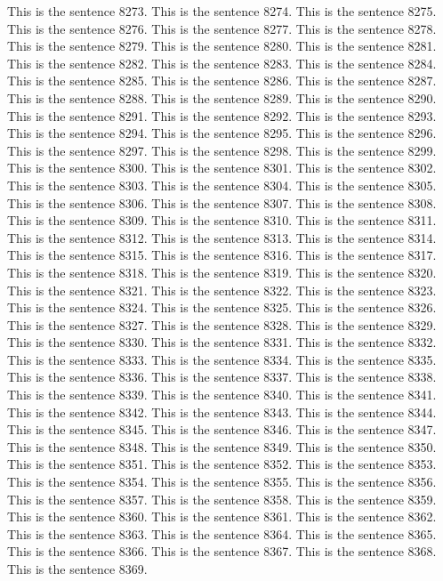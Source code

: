 \documentclass{article}
\begin{document}
This is the sentence 8273.
This is the sentence 8274.
This is the sentence 8275.
This is the sentence 8276.
This is the sentence 8277.
This is the sentence 8278.
This is the sentence 8279.
This is the sentence 8280.
This is the sentence 8281.
This is the sentence 8282.
This is the sentence 8283.
This is the sentence 8284.
This is the sentence 8285.
This is the sentence 8286.
This is the sentence 8287.
This is the sentence 8288.
This is the sentence 8289.
This is the sentence 8290.
This is the sentence 8291.
This is the sentence 8292.
This is the sentence 8293.
This is the sentence 8294.
This is the sentence 8295.
This is the sentence 8296.
This is the sentence 8297.
This is the sentence 8298.
This is the sentence 8299.
This is the sentence 8300.
This is the sentence 8301.
This is the sentence 8302.
This is the sentence 8303.
This is the sentence 8304.
This is the sentence 8305.
This is the sentence 8306.
This is the sentence 8307.
This is the sentence 8308.
This is the sentence 8309.
This is the sentence 8310.
This is the sentence 8311.
This is the sentence 8312.
This is the sentence 8313.
This is the sentence 8314.
This is the sentence 8315.
This is the sentence 8316.
This is the sentence 8317.
This is the sentence 8318.
This is the sentence 8319.
This is the sentence 8320.
This is the sentence 8321.
This is the sentence 8322.
This is the sentence 8323.
This is the sentence 8324.
This is the sentence 8325.
This is the sentence 8326.
This is the sentence 8327.
This is the sentence 8328.
This is the sentence 8329.
This is the sentence 8330.
This is the sentence 8331.
This is the sentence 8332.
This is the sentence 8333.
This is the sentence 8334.
This is the sentence 8335.
This is the sentence 8336.
This is the sentence 8337.
This is the sentence 8338.
This is the sentence 8339.
This is the sentence 8340.
This is the sentence 8341.
This is the sentence 8342.
This is the sentence 8343.
This is the sentence 8344.
This is the sentence 8345.
This is the sentence 8346.
This is the sentence 8347.
This is the sentence 8348.
This is the sentence 8349.
This is the sentence 8350.
This is the sentence 8351.
This is the sentence 8352.
This is the sentence 8353.
This is the sentence 8354.
This is the sentence 8355.
This is the sentence 8356.
This is the sentence 8357.
This is the sentence 8358.
This is the sentence 8359.
This is the sentence 8360.
This is the sentence 8361.
This is the sentence 8362.
This is the sentence 8363.
This is the sentence 8364.
This is the sentence 8365.
This is the sentence 8366.
This is the sentence 8367.
This is the sentence 8368.
This is the sentence 8369.
\end{document}
